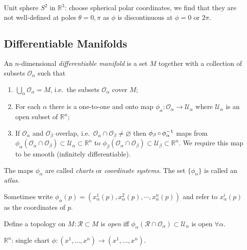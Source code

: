 \documentclass[a4paper,11pt]{article}
\begin{document}
	\begin{ex}
		Unit sphere $S^2$ in $\mathbb{R}^3$: choose spherical polar coordinates, we find that they are not well-defined at poles $\theta = 0, \pi$ as $\phi$ is discontinuous at $\phi = 0$ or $2\pi$.

	\end{ex}

	\subsection{Differentiable Manifolds}

	\begin{defi}
		An $n$-dimensional \emph{differentiable manifold} is a set $M$ together with a collection of subsets $\mathcal{O}_{\alpha}$ such that
		\begin{enumerate}
			\item $\bigcup_{\alpha} \mathcal{O}_\alpha = M$, i.e.\ the subsets $\mathcal{O}_{\alpha}$ cover $M$;
			\item For each $\alpha$ there is a one-to-one and onto map $\phi_{\alpha}: \mathcal{O}_{\alpha} \to \mathcal{U}_{\alpha}$ where $\mathcal{U}_{\alpha}$ is an open subset of $\mathbb{R}^n$;
			\item If $\mathcal{O}_{\alpha}$ and $\mathcal{O}_{\beta}$ overlap, i.e.\ $\mathcal{O}_\alpha \cap \mathcal{O}_\beta \neq \varnothing$ then $\phi_{\beta} \operatorname{\circ} \phi_{\alpha}^{-1}$ maps from $\phi_{\alpha}(\mathcal{O}_{\alpha} \cap \mathcal{O}_{\beta}) \subset \mathcal{U}_{\alpha} \subset \mathbb{R}^n$ to $\phi_{\beta}(\mathcal{O}_\alpha \cap \mathcal{O}_\beta) \subset \mathcal{U}_\beta \subset \mathbb{R}^n$. We require this map to be smooth (infinitely differentiable).    
		\end{enumerate}
		
		The maps $\phi_\alpha$ are called \emph{charts} or \emph{coordinate systems}. The set $\{\phi_\alpha\}$ is called an \emph{atlas}.
	
		\needfig{2}
	\end{defi}

	Sometimes write $\phi_\alpha(p) = (x_\alpha^1 (p), x_\alpha^2 (p), \cdots, x_\alpha^n (p))$ and refer to $x^i_\alpha(p)$ as the coordinates of $p$.

	Define a topology on $M: \mathcal{R} \subset M$ is \emph{open} iff $\phi_\alpha (\mathcal{R}\cap \mathcal{O}_\alpha) \subset \mathcal{U}_{\alpha}$ is open $\forall \alpha$.  

	\begin{ex}
		$\mathbb{R}^n$: single chart $\phi: (x^1, \dots, x^n) \to (x^1, \dots, x^n)$. 
	\end{ex}
\end{document}
